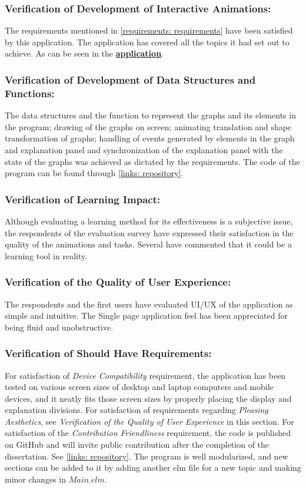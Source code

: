 \subsubsection{Verification of Development of Interactive Animations:}
The requirements mentioned in \autoref{requirements: requirements} have been
satisfied by this application.  The application has covered all the
topics it had set out to achieve. As can be seen in the
\href{https://visualise-graph-problems-with-me.netlify.app/} {\textbf{application}}.



\subsubsection{Verification of Development of Data Structures and Functions:}
The data structures and the function to represent the graphs and its elements
in the program; drawing of the graphs on screen; animating translation and
shape transformation of graphs; handling of events generated by elements in the
graph and explanation panel and synchronization of the explanation panel with
the state of the graphs was achieved as dictated by the requirements. The
code of the program can be found through \autoref{links: repository}.
 

\subsubsection{Verification of Learning Impact:}
Although evaluating a learning method for its effectiveness is a subjective
issue, the respondents of the evaluation survey have expressed their
satisfaction in the quality of the animations and tasks. Several have
commented that it could be a learning tool in reality.

\subsubsection{Verification of the Quality of User Experience:}
The respondents and the first users have evaluated UI/UX of the application as
simple and intuitive. The Single page application feel has been appreciated for being 
fluid and unobstructive. 

\subsubsection{Verification of Should Have Requirements:}
For satisfaction of \emph{Device Compatibility} requirement, the application has been
tested on various screen sizes of desktop and laptop computers and mobile
devices, and it neatly fits those screen sizes by properly placing the display and
explanation divisions.
For satisfaction of requirements regarding \emph{Pleasing Aesthetics}, see \emph{Verification of the Quality of
User Experience} in this section.
For satisfaction of the \emph{Contribution Friendliness} requirement, the code
is published on GitHub and will invite public contribution
after the completion of the dissertation. See \autoref{links: repository}.  The
program is well modularized, and new sections can be added to it by adding
another elm file for a new topic and making minor changes in $Main.elm$.
